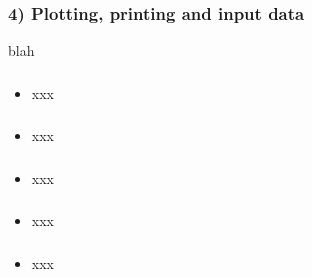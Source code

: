 \documentclass[14pt]{beamer}
\begin{document}
\begin{frame}[fragile]
\frametitle{4) Plotting, printing and input data}
blah
\end{frame}


\begin{frame}[fragile]
\frametitle{}
\begin{itemize}
\item xxx
\end{itemize}

\end{frame}


\begin{frame}[fragile]
\frametitle{}
\begin{itemize}
\item xxx
\end{itemize}

\end{frame}


\begin{frame}[fragile]
\frametitle{}
\begin{itemize}
\item xxx
\end{itemize}

\end{frame}


\begin{frame}[fragile]
\frametitle{}
\begin{itemize}
\item xxx
\end{itemize}

\end{frame}


\begin{frame}[fragile]
\frametitle{}
\begin{itemize}
\item xxx
\end{itemize}

\end{frame}

\end{document}
